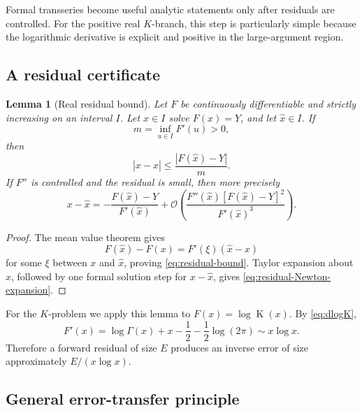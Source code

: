\documentclass[11pt,oneside]{article}
\theoremstyle{plain}
\newtheorem{lemma}[theorem]{Lemma}
\theoremstyle{definition}
\theoremstyle{remark}
\newcommand{\Kfun}{\operatorname{K}}
\newcommand{\BigO}{\mathcal{O}}
\begin{document}
Formal transseries become useful analytic statements only after residuals are
controlled.  For the positive real \(K\)-branch, this step is particularly
simple because the logarithmic derivative is explicit and positive in the
large-argument region.

\subsection{A residual certificate}

\begin{lemma}[Real residual bound]
\label{lem:residual-bound}
Let \(F\) be continuously differentiable and strictly increasing on an interval
\(I\).  Let \(x\in I\) solve \(F(x)=Y\), and let \(\widehat{x}\in I\).  If
\begin{equation}
 m=\inf_{u\in I}F'(u)>0,
 \label{eq:m-lower}
\end{equation}
then
\begin{equation}
 |x-\widehat{x}|
 \le\frac{|F(\widehat{x})-Y|}{m}.
 \label{eq:residual-bound}
\end{equation}
If \(F''\) is controlled and the residual is small, then more precisely
\begin{equation}
 x-\widehat{x}
 =-\frac{F(\widehat{x})-Y}{F'(\widehat{x})}
 +\BigO\!\left(
   \frac{F''(\widehat{x})[F(\widehat{x})-Y]^2}
        {F'(\widehat{x})^3}
 \right).
 \label{eq:residual-Newton-expansion}
\end{equation}
\end{lemma}

\begin{proof}
The mean value theorem gives
\[
 F(\widehat{x})-F(x)=F'(\xi)(\widehat{x}-x)
\]
for some \(\xi\) between \(x\) and \(\widehat{x}\), proving
\eqref{eq:residual-bound}.  Taylor expansion about \(\widehat{x}\), followed
by one formal solution step for \(x-\widehat{x}\), gives
\eqref{eq:residual-Newton-expansion}.
\end{proof}

For the \(K\)-problem we apply this lemma to
\(F(x)=\log\Kfun(x)\).  By \eqref{eq:dlogK},
\begin{equation}
 F'(x)=\log\Gamma(x)+x-\frac12-\frac12\log(2\pi)
 \sim x\log x.
 \label{eq:Fprime-asymptotic}
\end{equation}
Therefore a forward residual of size \(E\) produces an inverse error of size
approximately \(E/(x\log x)\).

\subsection{General error-transfer principle}
\end{document}
